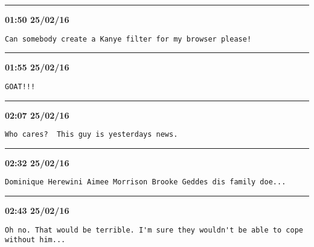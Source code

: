 \hrule%

\begin{adjustwidth}{0cm}{0cm}
\footnotesize \textbf{01:50 25/02/16}

\begin{lstlisting}[breaklines, breakatwhitespace, basicstyle=\small, frame=leftline]
Can somebody create a Kanye filter for my browser please!
\end{lstlisting}
\end{adjustwidth}

\hrule%

\begin{adjustwidth}{0cm}{0cm}
\footnotesize \textbf{01:55 25/02/16}

\begin{lstlisting}[breaklines, breakatwhitespace, basicstyle=\small, frame=leftline]
GOAT!!!
\end{lstlisting}
\end{adjustwidth}

\hrule%

\begin{adjustwidth}{0cm}{0cm}
\footnotesize \textbf{02:07 25/02/16}

\begin{lstlisting}[breaklines, breakatwhitespace, basicstyle=\small, frame=leftline]
Who cares?  This guy is yesterdays news.
\end{lstlisting}
\end{adjustwidth}

\hrule%

\begin{adjustwidth}{0cm}{0cm}
\footnotesize \textbf{02:32 25/02/16}

\begin{lstlisting}[breaklines, breakatwhitespace, basicstyle=\small, frame=leftline]
Dominique Herewini Aimee Morrison Brooke Geddes dis family doe...
\end{lstlisting}
\end{adjustwidth}

\hrule%

\begin{adjustwidth}{0cm}{0cm}
\footnotesize \textbf{02:43 25/02/16}

\begin{lstlisting}[breaklines, breakatwhitespace, basicstyle=\small, frame=leftline]
Oh no. That would be terrible. I'm sure they wouldn't be able to cope without him...
\end{lstlisting}
\end{adjustwidth}

